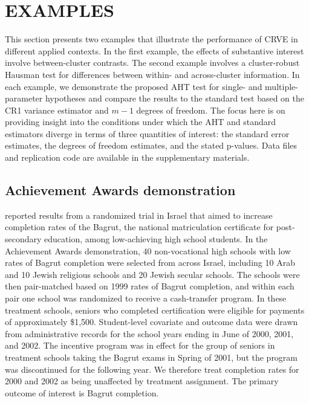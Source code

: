 \documentclass[12pt]{article}\usepackage[]{graphicx}\usepackage[]{color}
\begin{document}
\section{EXAMPLES}
\label{sec:examples}

This section presents two examples that illustrate the performance of CRVE in different applied contexts. 
In the first example, the effects of substantive interest involve between-cluster contrasts. 
The second example involves a cluster-robust Hausman test for differences between within- and across-cluster information. 
In each example, we demonstrate the proposed AHT test for single- and multiple-parameter hypotheses and compare the results to the standard test based on the CR1 variance estimator and $m - 1$ degrees of freedom. 
The focus here is on providing insight into the conditions under which the AHT and standard estimators diverge in terms of three quantities of interest: the standard error estimates, the degrees of freedom estimates, and the stated p-values. 
Data files and replication code are available in the supplementary materials.

\subsection{Achievement Awards demonstration} 

\citet{Angrist2009effects} reported results from a randomized trial in Israel that aimed to increase completion rates of the Bagrut, the national matriculation certificate for post-secondary education, among low-achieving high school students. 
In the Achievement Awards demonstration, 40 non-vocational high schools with low rates of Bagrut completion were selected from across Israel, including 10 Arab and 10 Jewish religious schools and 20 Jewish secular schools. 
The schools were then pair-matched based on 1999 rates of Bagrut completion, and within each pair one school was randomized to receive a cash-transfer program. 
In these treatment schools, seniors who completed certification were eligible for payments of approximately \$1,500. 
Student-level covariate and outcome data were drawn from administrative records for the school years ending in June of 2000, 2001, and 2002. 
The incentive program was in effect for the group of seniors in treatment schools taking the Bagrut exams in Spring of 2001, but the program was discontinued for the following year. 
We therefore treat completion rates for 2000 and 2002 as being unaffected by treatment assignment.
The primary outcome of interest is Bagrut completion. 
\end{document}
